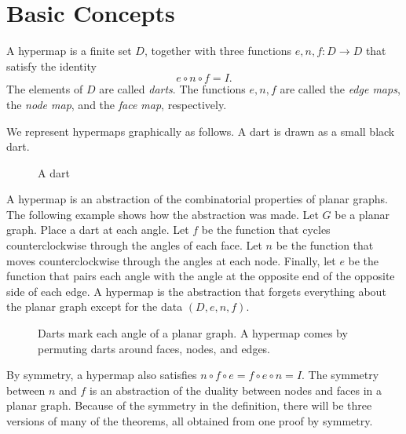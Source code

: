 


\section{Basic Concepts}



\begin{definition}  A hypermap is a finite set $D$, together with
three functions $e,n,f:D\to D$ that satisfy the identity
    $$e\circ n\circ f = I.$$
The elements of $D$ are called {\it darts}.  The functions $e,n,f$
are called the {\it edge maps}, the {\it node map}, and the {\it
face map}, respectively.
\end{definition}



\begin{remark} We represent hypermaps graphically as follows.  A
dart is drawn as a small black dart.
\end{remark}

\begin{figure}[htb]
  \centering
  \caption{A dart}
  \label{fig:dart}
\end{figure}

\begin{remark}\label{rem:hypermap} A hypermap is an abstraction of
the combinatorial properties of planar graphs.  The following
example shows how the abstraction was made.  Let $G$ be a planar
graph.  Place a dart at each angle.    Let $f$ be the function that
cycles counterclockwise through the angles of each face.  Let $n$ be
the function that moves counterclockwise through the angles at each
node.  Finally, let $e$ be the function that pairs each angle with
the angle at the opposite end of the opposite side of each edge.  A
hypermap is the abstraction that forgets everything about the planar
graph except for the data $(D,e,n,f)$.
\end{remark}

\begin{figure}[htb]
  \centering
  \caption{Darts mark each angle of a planar graph. A hypermap comes by
  permuting darts around faces, nodes, and edges.}
  \label{fig:hypermap_ex}
\end{figure}

By symmetry, a hypermap also satisfies $n\circ f\circ e = f\circ
e\circ n = I$.  The symmetry between $n$ and $f$ is an abstraction
of the duality between nodes and faces in a planar graph. Because of
the symmetry in the definition, there will be three versions of many
of the theorems, all obtained from one proof by symmetry.

